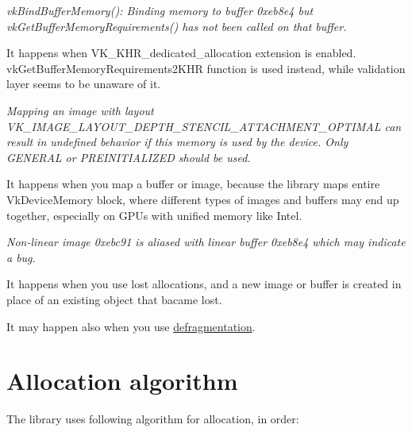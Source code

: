 \begin{DoxyItemize}
\item {\itshape vk\+Bind\+Buffer\+Memory()\+: Binding memory to buffer 0xeb8e4 but vk\+Get\+Buffer\+Memory\+Requirements() has not been called on that buffer.}
\begin{DoxyItemize}
\item It happens when V\+K\+\_\+\+K\+H\+R\+\_\+dedicated\+\_\+allocation extension is enabled. {\ttfamily vk\+Get\+Buffer\+Memory\+Requirements2\+K\+HR} function is used instead, while validation layer seems to be unaware of it.
\end{DoxyItemize}
\item {\itshape Mapping an image with layout V\+K\+\_\+\+I\+M\+A\+G\+E\+\_\+\+L\+A\+Y\+O\+U\+T\+\_\+\+D\+E\+P\+T\+H\+\_\+\+S\+T\+E\+N\+C\+I\+L\+\_\+\+A\+T\+T\+A\+C\+H\+M\+E\+N\+T\+\_\+\+O\+P\+T\+I\+M\+AL can result in undefined behavior if this memory is used by the device. Only G\+E\+N\+E\+R\+AL or P\+R\+E\+I\+N\+I\+T\+I\+A\+L\+I\+Z\+ED should be used.}
\begin{DoxyItemize}
\item It happens when you map a buffer or image, because the library maps entire {\ttfamily Vk\+Device\+Memory} block, where different types of images and buffers may end up together, especially on G\+P\+Us with unified memory like Intel.
\end{DoxyItemize}
\item {\itshape Non-\/linear image 0xebc91 is aliased with linear buffer 0xeb8e4 which may indicate a bug.}
\begin{DoxyItemize}
\item It happens when you use lost allocations, and a new image or buffer is created in place of an existing object that bacame lost.
\item It may happen also when you use \hyperlink{defragmentation}{defragmentation}.
\end{DoxyItemize}
\end{DoxyItemize}\hypertarget{general_considerations_general_considerations_allocation_algorithm}{}\section{Allocation algorithm}\label{general_considerations_general_considerations_allocation_algorithm}
The library uses following algorithm for allocation, in order\+:


